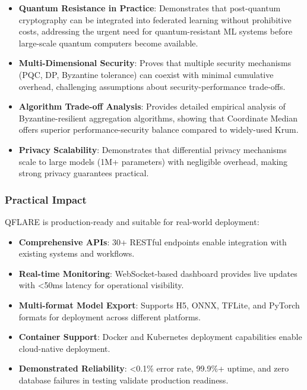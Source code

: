 \documentclass[12pt,a4paper]{article}
\begin{document}
\begin{itemize}
    \item \textbf{Quantum Resistance in Practice}: Demonstrates that post-quantum cryptography can be integrated into federated learning without prohibitive costs, addressing the urgent need for quantum-resistant ML systems before large-scale quantum computers become available.
    
    \item \textbf{Multi-Dimensional Security}: Proves that multiple security mechanisms (PQC, DP, Byzantine tolerance) can coexist with minimal cumulative overhead, challenging assumptions about security-performance trade-offs.
    
    \item \textbf{Algorithm Trade-off Analysis}: Provides detailed empirical analysis of Byzantine-resilient aggregation algorithms, showing that Coordinate Median offers superior performance-security balance compared to widely-used Krum.
    
    \item \textbf{Privacy Scalability}: Demonstrates that differential privacy mechanisms scale to large models (1M+ parameters) with negligible overhead, making strong privacy guarantees practical.
\end{itemize}

\subsubsection{Practical Impact}

QFLARE is production-ready and suitable for real-world deployment:

\begin{itemize}
    \item \textbf{Comprehensive APIs}: 30+ RESTful endpoints enable integration with existing systems and workflows.
    
    \item \textbf{Real-time Monitoring}: WebSocket-based dashboard provides live updates with <50ms latency for operational visibility.
    
    \item \textbf{Multi-format Model Export}: Supports H5, ONNX, TFLite, and PyTorch formats for deployment across different platforms.
    
    \item \textbf{Container Support}: Docker and Kubernetes deployment capabilities enable cloud-native deployment.
    
    \item \textbf{Demonstrated Reliability}: <0.1\% error rate, 99.9\%+ uptime, and zero database failures in testing validate production readiness.
\end{itemize}
\end{document}
